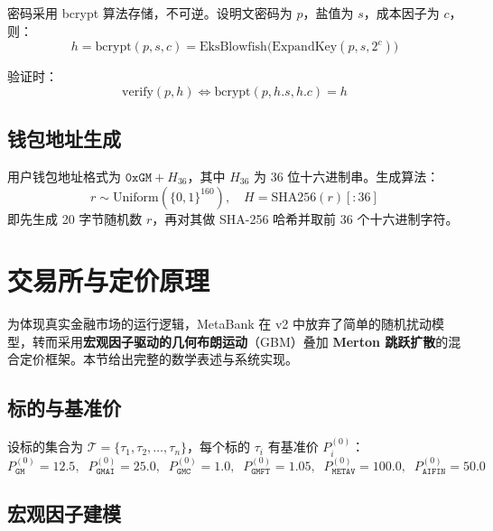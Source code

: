 \documentclass[12pt,a4paper]{article}
\begin{document}
密码采用 bcrypt 算法存储，不可逆。设明文密码为 $p$，盐值为 $s$，成本因子为 $c$，则：
\begin{equation}
h = \mathrm{bcrypt}(p, s, c) = \mathrm{EksBlowfish}\bigl( \mathrm{ExpandKey}(p, s, 2^c) \bigr)
\end{equation}

验证时：
\begin{equation}
\mathrm{verify}(p, h) \iff \mathrm{bcrypt}(p, h.s, h.c) = h
\end{equation}

\subsection{钱包地址生成}

用户钱包地址格式为 $\mathtt{0xGM} + H_{36}$，其中 $H_{36}$ 为 36 位十六进制串。生成算法：
\begin{equation}
r \sim \mathrm{Uniform}(\{0,1\}^{160}), \quad H = \mathrm{SHA256}(r)[:36]
\end{equation}
即先生成 20 字节随机数 $r$，再对其做 SHA-256 哈希并取前 36 个十六进制字符。

\section{交易所与定价原理}

为体现真实金融市场的运行逻辑，MetaBank 在 v2 中放弃了简单的随机扰动模型，转而采用\textbf{宏观因子驱动的几何布朗运动}（GBM）叠加 \textbf{Merton 跳跃扩散}的混合定价框架。本节给出完整的数学表述与系统实现。

\subsection{标的与基准价}

设标的集合为 $\mathcal{T} = \{\tau_1, \tau_2, \ldots, \tau_n\}$，每个标的 $\tau_i$ 有基准价 $P_i^{(0)}$：
\begin{equation}
P_{\mathtt{GM}}^{(0)} = 12.5,\;\; P_{\mathtt{GMAI}}^{(0)} = 25.0,\;\; P_{\mathtt{GMC}}^{(0)} = 1.0,\;\; P_{\mathtt{GMFT}}^{(0)} = 1.05,\;\; P_{\mathtt{METAV}}^{(0)} = 100.0,\;\; P_{\mathtt{AIFIN}}^{(0)} = 50.0
\end{equation}

\subsection{宏观因子建模}
\label{sec:macro}
\end{document}

